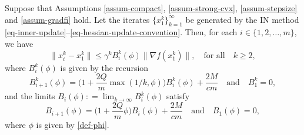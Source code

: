 \documentclass[final,numbook]{svjour3}
\begin{document}
\begin{lemma}\label{lemm-Bi-growth} Suppose that Assumptions \ref{assum-compact}, \ref{assum-strong-cvx}, \ref{assum-stepsize} and \ref{assum-gradfi} hold. Let the iterates $\{x_1^k\}_{k=1}^\infty$ be generated by the IN method \eqref{eq-inner-update}--\eqref{eq-hessian-update-convention}. Then, for each $i \in \{1,2,\dots,m\}$, we have
\begin{equation}\label{ineq-inner-iter-distance-bound-by-grad} \| x_i^k - x_1^k \| \leq \gamma^k {{B_i^k}}(\phi)  \|\nabla f(x_1^k)\|, \quad \mbox{for all} \quad k\geq 2,
\end{equation} 
where ${{B_i^k}}(\phi)$ is given by the recursion \begin{equation} B_{i+1}^k(\phi) =  \bigg(1+ \frac{2Q}{m} \max(1/k,\phi)\bigg){{B_i^k}}(\phi) + \frac{2M}{cm} \quad \mbox{and} \quad B_1^k = 0,\label{eq-Bik-phi} \end{equation} 
and the limits $ B_i(\phi) : = \lim_{k \to \infty} B_i^k(\phi) $
satisfy 
 \begin{equation}\label{eq-recursive-B-phi} B_{i+1}(\phi) =  \bigg(1+ \frac{2Q}{m}\phi\bigg)B_i(\phi) + \frac{2M}{cm} \quad \mbox{and} \quad B_1(\phi) = 0,
 \end{equation} 
where $\phi$ is given by \eqref{def-phi}.
\end{lemma}
\end{document}
